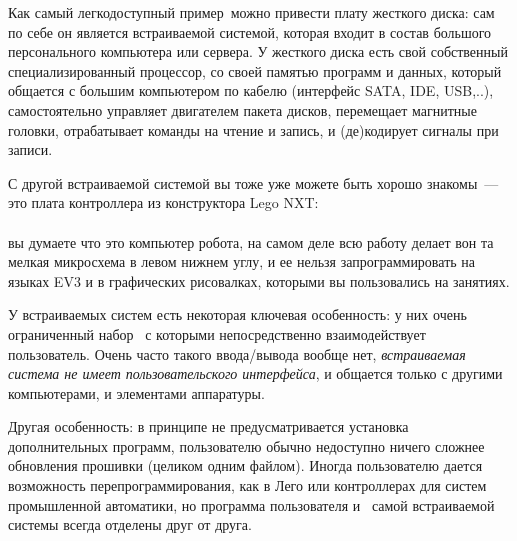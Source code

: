 Как самый легкодоступный пример\ можно
привести плату жесткого диска:
сам по себе он является встраиваемой системой, которая входит в состав большого
персонального компьютера или сервера. У жесткого диска есть свой собственный
специализированный процессор, со своей памятью программ и данных, который
общается с большим компьютером по кабелю (интерфейс SATA, IDE, USB,..),
самостоятельно управляет двигателем пакета дисков, перемещает магнитные головки,
отрабатывает команды на чтение и запись, и (де)кодирует сигналы при записи. 

\clearpage
С другой встраиваемой системой вы тоже уже можете быть хорошо знакомы\ --- это
плата контроллера из конструктора Lego NXT:\\
\\
вы думаете что это компьютер робота, на самом деле всю работу делает вон та
мелкая микросхема в левом нижнем углу, и ее нельзя запрограммировать на языках
EV3 и в графических рисовалках, которыми вы пользовались на занятиях.

У встраиваемых систем есть некоторая ключевая особенность: у них очень
ограниченный набор \ с которыми непосредственно
взаимодействует пользователь. Очень часто такого ввода/вывода вообще нет,
\emph{встраиваемая система не имеет пользовательского интерфейса}, и общается
только с другими компьютерами, и элементами аппаратуры.

Другая особенность: в принципе не предусматривается установка дополнительных
программ, пользователю обычно недоступно ничего сложнее обновления прошивки
(целиком одним файлом). Иногда пользователю дается возможность
перепрограммирования, как в Лего или контроллерах для систем промышленной
автоматики, но программа пользователя и \ самой
встраиваемой системы всегда отделены друг от друга.

